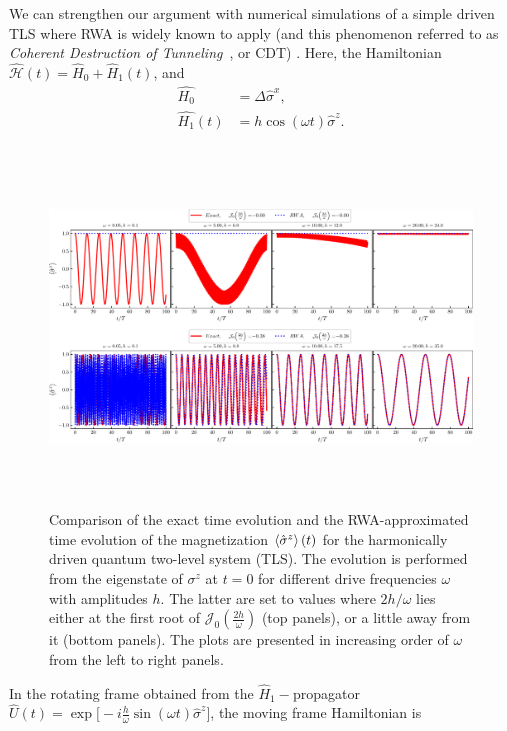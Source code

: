 \documentclass[aps,prb,reprint,showpacs,floatfix,superscriptaddress, onecolumn, nofootinbib, 9pt]{revtex4-2}
\newcommand{\ar}[1]{{\color{blue}#1}} %
\begin{document}
\begin{enumerate}
{ We can strengthen our argument with numerical simulations of a simple driven TLS  where RWA is widely known to apply (and this phenomenon referred to as \textit{Coherent Destruction of Tunneling}~\cite{Grossmann1991, Ashhab2007}, or CDT) . Here, the Hamiltonian $\hat{\mathcal{H}}(t) = \hat{H}_0 + \hat{H}_1(t)$, and  
\begin{align}
\hat{H_0} &= \Delta \hat{\sigma}^x,\nonumber \\
\hat{H_1}(t) &= h \cos(\omega t)\hat{\sigma}^z.
\end{align}}
\begin{figure}[t!]
\begin{center}
	\includegraphics[height=9.5cm]{rwa_vs_exact_w_low_n_high_frz_nfrz.pdf}
\end{center}
\caption[] {Comparison of the exact time evolution and the RWA-approximated time evolution of the magnetization $\expval{\hat{\sigma}^z}(t)$ for the harmonically driven quantum two-level system (TLS). The evolution is performed from the eigenstate of $\sigma^z$ at $t=0$ for different drive frequencies $\omega$ with amplitudes $h$. The latter are set to values where $2h/\omega$ lies either at the first root of $\mathcal{J}_0\left(\frac{2h}{\omega}\right)$ (top panels), or a little away from it (bottom panels). The plots are presented in increasing order of $\omega$ from the left to right panels.}
\label{Fig:compare_exact_rwa}
\end{figure}
\ar{In the rotating frame obtained from the $\hat{H}_1-$propagator $\hat{U}(t) = \exp\big[-i \frac{h}{\omega} \sin(\omega t)\hat{\sigma}^z\big]$, the moving frame Hamiltonian is
\begin{align}

\end{align}}
\end{enumerate}
\end{document}

